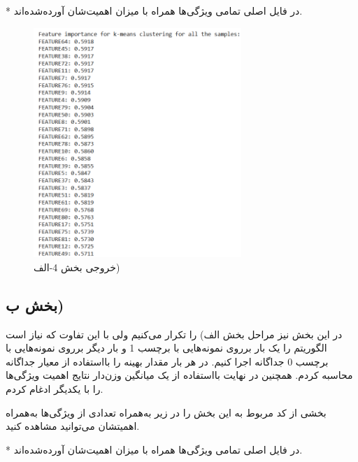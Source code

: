 \documentclass{article}
\begin{document}
* در فایل اصلی تمامی ویژگی‌ها همراه با میزان اهمیت‌شان آورده‌شده‌اند.
\begin{figure}[ht]
        \centering
        \includegraphics[width=0.7\textwidth]{4-1.png}
        \caption{خروجی بخش 4-الف)}
        \label{fig:fig5}
\end{figure}

\lr{}

\newpage
\subsection{بخش ب)}
در این بخش نیز مراحل بخش الف) را تکرار می‌کنیم ولی با این تفاوت که نیاز است الگوریتم  را یک بار برروی نمونه‌هایی با برچسب 1 و بار دیگر برروی نمونه‌هایی با برچسب 0 جداگانه اجرا کنیم. در هر بار مقدار بهینه  را بااستفاده از معیار  جداگانه محاسبه کردم. همچنین در نهایت بااستفاده از یک میانگین وزن‌دار نتایج اهمیت ویژگی‌ها را با یکدیگر ادغام کردم.

بخشی از کد مربوط به این بخش را در زیر به‌همراه تعدادی از ویژگی‌ها به‌همراه اهمیتشان می‌توانید مشاهده کنید.

* در فایل اصلی تمامی ویژگی‌ها همراه با میزان اهمیت‌شان آورده‌شده‌اند.
\end{document}

